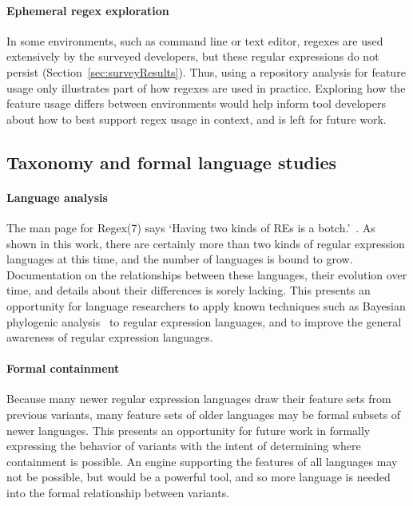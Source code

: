 \paragraph{Ephemeral regex exploration} In some environments, such as command line or text editor, regexes are used extensively by the surveyed developers, but these regular expressions do not persist (Section~\ref{sec:surveyResults}). Thus, using a repository analysis for feature usage only illustrates part of how regexes are used in practice. Exploring how the feature usage differs between environments would help inform tool developers about how to best support regex usage in context, and is left for future work.

\subsection{Taxonomy and formal language studies}
\paragraph{Language analysis} The man page for Regex(7) says `Having two kinds of REs is a botch.'~\citep{regexManual}.  As shown in this work, there are certainly more than two kinds of regular expression languages at this time, and the number of languages is bound to grow.  Documentation on the relationships between these languages, their evolution over time, and details about their differences is sorely lacking.  This presents an opportunity for language researchers to apply known techniques such as Bayesian phylogenic analysis~\citep{Kitchen2703} to regular expression languages, and to improve the general awareness of regular expression languages.

\paragraph{Formal containment} Because many newer regular expression languages draw their feature sets from previous variants, many feature sets of older languages may be formal subsets of newer languages.  This presents an opportunity for future work in formally expressing the behavior of variants with the intent of determining where containment is possible.  An engine supporting the features of all languages may not be possible, but would be a powerful tool, and so more language is needed into the formal relationship between variants.



